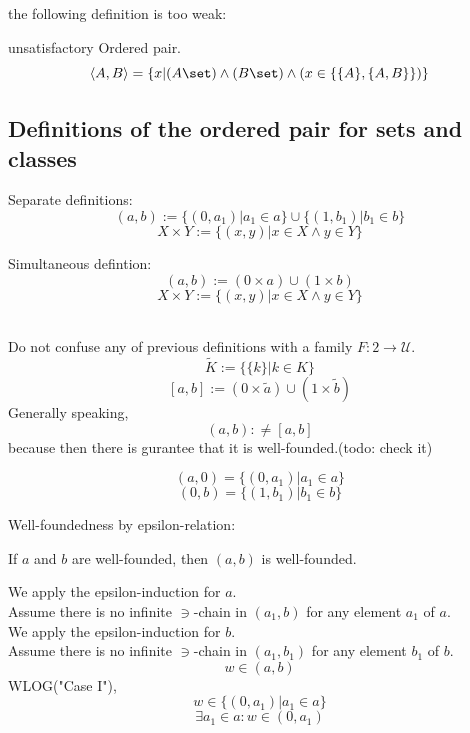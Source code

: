 \def\topic{}


the following definition is too weak:
\begin{definition}
\label{def:ordered pair} unsatisfactory
Ordered pair. %
\[
\langle A,B \rangle=\{x|(A\set)\land(B\set)\land (x\in\{\{A\},\{A,B\}\})\}
\]
\end{definition}

\subsection{Definitions of the ordered pair for sets and classes}
Separate definitions:
\[
(a,b) := \{(0,a_1)|a_1\in a\}\cup \{(1,b_1)|b_1\in b\}
\]
\[
X\times Y := \{(x,y)|x\in X \land y\in Y\}
\]

\noindent Simultaneous defintion:
\[
(a,b) := ({0}\times a)\cup ({1}\times b)
\]
\[
X\times Y := \{(x,y)|x\in X \land y\in Y\}
\]

\begin{remark}\ \\
Do not confuse any of previous definitions with a family $F:2\to\mathcal{U}$.
\[
\tilde{K}:= \{\{k\}| k\in K\}
\]
\[
[a,b] := ({0}\times \tilde{a})\cup ({1}\times \tilde{b})
\]
Generally speaking,
\[
(a,b) :\neq [a,b]
\]
because then there is gurantee that it is well-founded.(todo: check it)\\
\end{remark}



\[
(a,0) = \{(0,a_1)|a_1\in a\}
\]
\[
(0,b) = \{(1,b_1)|b_1\in b\}
\]


Well-foundedness by epsilon-relation:\\
\begin{theorem}
If $a$ and $b$ are well-founded, then $(a,b)$ is well-founded.
\end{theorem}
\Proof
We apply the epsilon-induction for $a$.\\ %
Assume there is no infinite $\ni$-chain in $(a_1,b)$ for any element $a_1$ of $a$.\\
We apply the epsilon-induction for $b$.\\
Assume there is no infinite $\ni$-chain in $(a_1,b_1)$ for any element $b_1$ of $b$.\\
\[
w\in (a,b)
\]
WLOG("Case I"), 
\[
w\in \{(0,a_1)|a_1\in a\}
\]
\[
\exists a_1\in a: w\in (0,a_1)
\]

